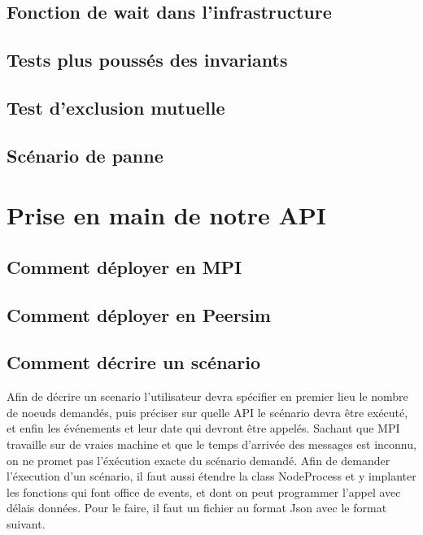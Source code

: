\documentclass{article}
\begin{document}
			\subsection{Fonction de wait dans l'infrastructure}		
			\subsection{Tests plus poussés des invariants}
			\subsection{Test d'exclusion mutuelle}
			\subsection{Scénario de panne}
		
		\newpage
		\section{Prise en main de notre API}
		\subsection{Comment déployer en MPI}
		\subsection{Comment déployer en Peersim}
		\subsection{Comment décrire un scénario}
		Afin de décrire un scenario l'utilisateur devra spécifier en premier lieu le nombre de noeuds demandés, puis préciser sur quelle API le scénario devra être exécuté, et enfin les événements et leur date qui devront être appelés.
		\newline
		Sachant que MPI travaille sur de vraies machine et que le temps d'arrivée des messages est inconnu, on ne promet pas l'éxécution exacte du scénario demandé.
			\newline
			\newline
			Afin de demander l'éxecution d'un scénario, il faut aussi étendre la class NodeProcess et y 
			implanter les fonctions qui font office de events, et dont on peut programmer l'appel avec délais données.
			Pour le faire, il faut un fichier au format Json avec le format suivant.
\end{document}
